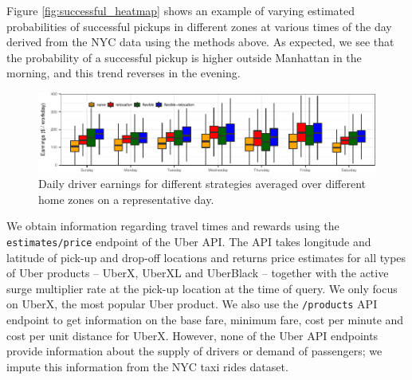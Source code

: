 Figure \ref{fig:successful_heatmap} shows an example of varying estimated probabilities of successful pickups 
  in different zones at various times of the day derived from the NYC data using the methods above. 
As expected, we see that the probability of a successful pickup is higher outside Manhattan in the morning, 
  and this trend reverses in the evening.

\begin{figure}
	\centering
	\includegraphics{figures/daily_simulated_earnings.pdf}
	\setlength{\belowcaptionskip}{-5pt}
	\caption{Daily driver earnings for different strategies averaged over different home zones on a representative day.}
	\label{fig:daily_earnings}
\end{figure}

 We obtain information regarding travel times and rewards using the \texttt{estimates/price} endpoint of the Uber API.
The API takes longitude and latitude of pick-up and drop-off locations and returns price estimates for all types of Uber products -- UberX, UberXL and UberBlack --  together with the active surge multiplier rate at the pick-up location at the time of query.  We only focus on UberX, the most popular Uber product. We also use the \texttt{/products} API endpoint to get information on the base fare, minimum fare, cost per minute and cost per unit distance for UberX. However, none of the Uber API endpoints provide information about the supply of  drivers or demand of passengers; we impute this 
information from the NYC taxi rides dataset.

